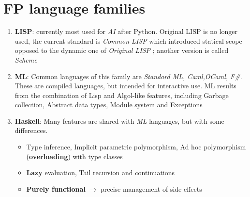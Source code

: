 \section{FP language families}
\begin{enumerate}
   \item \textbf{LISP}: currently most used for \textit{AI} after Python.
   Original LISP is no longer used, the current standard is \textit{Common LISP} which introduced statical scope opposed to the dynamic one of \textit{Original LISP} ;
   another version is called \textit{Scheme}
   \item \textbf{ML}: Common languages of this family are \textit{Standard ML, Caml,OCaml, F\#}.
   These are compiled languages, but intended for interactive use.
   ML results from the combination of Lisp and Algol-like features, including Garbage collection,
   Abstract data types,
   Module system and
   Exceptions
   \item \textbf{Haskell}: Many features are shared with \textit{ML} languages,
   but with some differences.
   \begin{itemize}
      \item Type inference, Implicit parametric polymorphism, Ad hoc polymorphism (\textbf{overloading}) with type classes
      \item \textbf{Lazy} evaluation, Tail recursion and continuations
      \item \textbf{Purely functional} $\rightarrow$ precise management of side effects
   \end{itemize}
\end{enumerate}
\newpage
